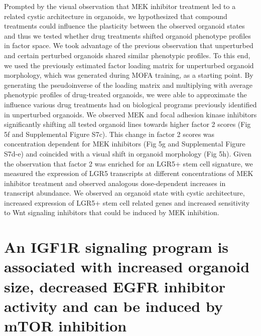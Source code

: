 \begin{flushleft}
Prompted by the visual observation that MEK inhibitor treatment led to a related cystic architecture in organoids, we hypothesized that compound treatments could influence the plasticity between the observed organoid states and thus we tested whether drug treatments shifted organoid phenotype profiles in factor space. We took advantage of the previous observation that unperturbed and certain perturbed organoids shared similar phenotypic profiles. To this end, we used the previously estimated factor loading matrix for unperturbed organoid morphology, which was generated during MOFA training, as a starting point. By generating the pseudoinverse of the loading matrix and multiplying with average phenotypic profiles of drug-treated organoids, we were able to approximate the influence various drug treatments had on biological programs previously identified in unperturbed organoids. We observed MEK and focal adhesion kinase inhibitors significantly shifting all tested organoid lines towards higher factor 2 scores (Fig 5f and Supplemental Figure S7c). This change in factor 2 scores was concentration dependent for MEK inhibitors (Fig 5g and Supplemental Figure S7d-e) and coincided with a visual shift in organoid morphology (Fig 5h). Given the observation that factor 2 was enriched for an LGR5+ stem cell signature, we measured the expression of LGR5 transcripts at different concentrations of MEK inhibitor treatment and observed analogous dose-dependent increases in transcript abundance. We observed an organoid state with cystic architecture, increased expression of LGR5+ stem cell related genes and increased sensitivity to Wnt signaling inhibitors that could be induced by MEK inhibition.

\section{An IGF1R signaling program is associated with increased organoid size, decreased EGFR inhibitor activity and can be induced by mTOR inhibition}


\end{flushleft}
